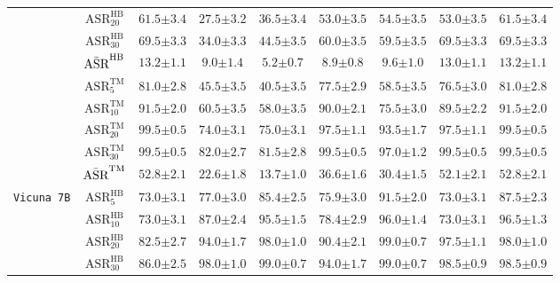 \begin{table}[t]
{\begin{tabular}{c|c||c|c|c|c||c|c|c}
& $\text{ASR}^{\text{HB}}_{20}$ & $\mathbf{61.5{\pm 3.4}}$ & $27.5{\pm 3.2}$ & $36.5{\pm 3.4}$ & $53.0{\pm 3.5}$ & $54.5{\pm 3.5}$ & $53.0{\pm 3.5}$ & $\mathbf{61.5{\pm 3.4}}$ \\
& $\text{ASR}^{\text{HB}}_{30}$ & $69.5{\pm 3.3}$ & $34.0{\pm 3.3}$ & $44.5{\pm 3.5}$ & $60.0{\pm 3.5}$ & $59.5{\pm 3.5}$ & $\mathbf{69.5{\pm 3.3}}$ & $69.5{\pm 3.3}$ \\
& $\Bar{\text{ASR}}^{\text{HB}}$ & $\mathbf{13.2{\pm 1.1}}$ & $9.0{\pm 1.4}$ & $5.2{\pm 0.7}$ & $8.9{\pm 0.8}$ & $9.6{\pm 1.0}$ & $13.0{\pm 1.1}$ & $\mathbf{13.2{\pm 1.1}}$ \\
\cline{2-9}
& $\text{ASR}^{\text{TM}}_{5}$ & $\mathbf{81.0{\pm 2.8}}$ & $45.5{\pm 3.5}$ & $40.5{\pm 3.5}$ & $77.5{\pm 2.9}$ & $58.5{\pm 3.5}$ & $76.5{\pm 3.0}$ & $\mathbf{81.0{\pm 2.8}}$ \\
& $\text{ASR}^{\text{TM}}_{10}$ & $\mathbf{91.5{\pm 2.0}}$ & $60.5{\pm 3.5}$ & $58.0{\pm 3.5}$ & $90.0{\pm 2.1}$ & $75.5{\pm 3.0}$ & $89.5{\pm 2.2}$ & $\mathbf{91.5{\pm 2.0}}$ \\
& $\text{ASR}^{\text{TM}}_{20}$ & $\mathbf{99.5{\pm 0.5}}$ & $74.0{\pm 3.1}$ & $75.0{\pm 3.1}$ & $97.5{\pm 1.1}$ & $93.5{\pm 1.7}$ & $97.5{\pm 1.1}$ & $\mathbf{99.5{\pm 0.5}}$ \\
& $\text{ASR}^{\text{TM}}_{30}$ & $99.5{\pm 0.5}$ & $82.0{\pm 2.7}$ & $81.5{\pm 2.8}$ & $\mathbf{99.5{\pm 0.5}}$ & $97.0{\pm 1.2}$ & $99.5{\pm 0.5}$ & $99.5{\pm 0.5}$ \\
& $\Bar{\text{ASR}}^{\text{TM}}$ & $\mathbf{52.8{\pm 2.1}}$ & $22.6{\pm 1.8}$ & $13.7{\pm 1.0}$ & $36.6{\pm 1.6}$ & $30.4{\pm 1.5}$ & $52.1{\pm 2.1}$ & $\mathbf{52.8{\pm 2.1}}$ \\
\hline
\hline
\multirow{11}{*}{\texttt{Vicuna 7B}} 
& $\text{ASR}^{\text{HB}}_{5}$ & $73.0{\pm 3.1}$ & $77.0{\pm 3.0}$ & $85.4{\pm 2.5}$ & $75.9{\pm 3.0}$ & $\mathbf{91.5{\pm 2.0}}$ & $73.0{\pm 3.1}$ & $87.5{\pm 2.3}$ \\
& $\text{ASR}^{\text{HB}}_{10}$ & $73.0{\pm 3.1}$ & $87.0{\pm 2.4}$ & $95.5{\pm 1.5}$ & $78.4{\pm 2.9}$ & $96.0{\pm 1.4}$ & $73.0{\pm 3.1}$ & $\mathbf{96.5{\pm 1.3}}$ \\
& $\text{ASR}^{\text{HB}}_{20}$ & $82.5{\pm 2.7}$ & $94.0{\pm 1.7}$ & $98.0{\pm 1.0}$ & $90.4{\pm 2.1}$ & $\mathbf{99.0{\pm 0.7}}$ & $97.5{\pm 1.1}$ & $98.0{\pm 1.0}$ \\
& $\text{ASR}^{\text{HB}}_{30}$ & $86.0{\pm 2.5}$ & $98.0{\pm 1.0}$ & $99.0{\pm 0.7}$ & $94.0{\pm 1.7}$ & $\mathbf{99.0{\pm 0.7}}$ & $98.5{\pm 0.9}$ & $98.5{\pm 0.9}$ \\

\end{tabular}}
\end{table}
